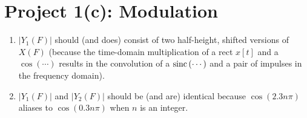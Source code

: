 \documentclass{ajhlabreport}
\begin{document}
\newpage
\chapter{Project 1(c): Modulation}


\begin{enumerate}
%
\item $|Y_1(F)|$ should (and does) consist of two half-height, shifted versions
of $X(F)$ (because the time-domain multiplication of a rect $x[t]$ and a
$\cos{(\cdots)}$ results in the convolution of a $\operatorname{sinc}{(\cdots)}$ and a pair of
impulses in the frequency domain).
%
\item $|Y_1(F)|$ and $|Y_2(F)|$ should be (and are) identical because
$\cos{(2.3n\pi)}$ aliases to $\cos{(0.3n\pi)}$ when $n$ is an integer.
%
\end{enumerate}
\end{document}
